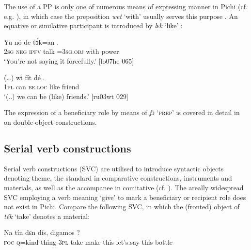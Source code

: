 The use of a PP is only one of numerous means of expressing manner in Pichi \is{}(cf. e.g. ), in which case the preposition \textit{wet} ‘with’ usually serves this purpose . An equative or similative participant is introduced by \textit{lɛk} ‘like’ :


\ea%
    \label{ex:key:1075}
    \gll Yu  nó  de  tɔ́k=an        .\\
\textsc{2sg}  \textsc{neg}  \textsc{ipfv}  talk  =\textsc{3sg.obj}  with    power\\

\glt ‘You’re not saying it forcefully.’ [lo07he 065]
\z


\ea%
    \label{ex:key:1076}
    \gll (…)  wi  fít  dé    .\\
    {} \textsc{1pl}  can  \textsc{be.loc}  like  friend\\

\glt ‘(..) we can be (like) friends.’ [ru03wt 029]
\z

The expression of a beneficiary role by means of \textit{fɔ} ‘\textsc{prep}’ is covered in detail in  on double-object constructions. 

\subsection{Serial verb constructions}\label{sec:9.1.4}

Serial verb constructions (SVC) are utilised to introduce syntactic objects denoting theme, the standard in comparative constructions, instrument\is{}s and material\index{}s, as well as the accompanee in comitative (cf. \textsc{).} The areally widespread SVC employing a verb meaning ‘give’ to mark a beneficiary or recipient role does not exist in Pichi. Compare the following SVC, in which the (fronted) object of \textit{ték} ‘take’ denotes a material: 


\ea%
    \label{ex:key:1077}
    \gll Na    tín    dɛn          dís,  digamos  ?\\
\textsc{foc}  \textsc{q}=kind  thing  \textsc{3pl}  take    make  this  let’s.say  this  bottle\\


